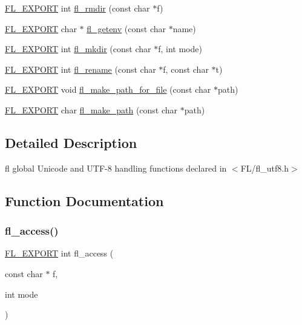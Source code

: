 \begin{DoxyCompactItemize}
\item 
\hyperlink{_fl___export_8_h_aa9ba29a18aee9d738370a06eeb4470fc}{F\+L\+\_\+\+E\+X\+P\+O\+RT} int \hyperlink{group__fl__unicode_gac74d538cfa2f6369f18324483b529c0b}{fl\+\_\+rmdir} (const char $\ast$f)
\item 
\hyperlink{_fl___export_8_h_aa9ba29a18aee9d738370a06eeb4470fc}{F\+L\+\_\+\+E\+X\+P\+O\+RT} char $\ast$ \hyperlink{group__fl__unicode_ga47d70cf254ed703837473bd471a0fdf7}{fl\+\_\+getenv} (const char $\ast$name)
\item 
\hyperlink{_fl___export_8_h_aa9ba29a18aee9d738370a06eeb4470fc}{F\+L\+\_\+\+E\+X\+P\+O\+RT} int \hyperlink{group__fl__unicode_gab6d68674173b9d5b3512e9f32f709b9d}{fl\+\_\+mkdir} (const char $\ast$f, int mode)
\item 
\hyperlink{_fl___export_8_h_aa9ba29a18aee9d738370a06eeb4470fc}{F\+L\+\_\+\+E\+X\+P\+O\+RT} int \hyperlink{group__fl__unicode_ga59dc5076041c976443b2e09b8623faca}{fl\+\_\+rename} (const char $\ast$f, const char $\ast$t)
\item 
\hyperlink{_fl___export_8_h_aa9ba29a18aee9d738370a06eeb4470fc}{F\+L\+\_\+\+E\+X\+P\+O\+RT} void \hyperlink{group__fl__unicode_gad31a7bd1f016d005086f60af8b3c37e5}{fl\+\_\+make\+\_\+path\+\_\+for\+\_\+file} (const char $\ast$path)
\item 
\hyperlink{_fl___export_8_h_aa9ba29a18aee9d738370a06eeb4470fc}{F\+L\+\_\+\+E\+X\+P\+O\+RT} char \hyperlink{group__fl__unicode_ga9c168dd8007ac82e747994134edc2d6b}{fl\+\_\+make\+\_\+path} (const char $\ast$path)
\end{DoxyCompactItemize}


\subsection{Detailed Description}
fl global Unicode and U\+T\+F-\/8 handling functions declared in $<$F\+L/fl\+\_\+utf8.\+h$>$ 

\subsection{Function Documentation}
\mbox{\label{group__fl__unicode_ga70c2ee45d564110f36f940826990ea85}} 
\subsubsection{\texorpdfstring{fl\+\_\+access()}{fl\_access()}}
{\footnotesize\ttfamily \hyperlink{_fl___export_8_h_aa9ba29a18aee9d738370a06eeb4470fc}{F\+L\+\_\+\+E\+X\+P\+O\+RT} int fl\+\_\+access (\begin{DoxyParamCaption}\item[{const char $\ast$}]{f,  }\item[{int}]{mode }\end{DoxyParamCaption})}

